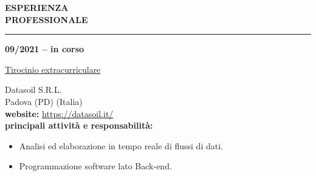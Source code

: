 \hspace{5mm}
\begin{minipage}[b]{0.3\textwidth}
	\textbf{ESPERIENZA \\PROFESSIONALE}
\end{minipage}%
\hfill
\hfill
\begin{minipage}[t]{0.6\textwidth}		
	\rule{\textwidth}{0.4pt}
\end{minipage}%
\vspace{5mm}


\begin{minipage}[t]{0.3\textwidth}
	\textbf{09/2021 – in corso}
\end{minipage}%
\hfill
\hfill
\begin{minipage}[t]{0.6\textwidth}		
	\begin{Large}
		\underline{Tirocinio extracurriculare} \vspace{1mm}\\
	\end{Large} 
		Datasoil S.R.L. \\
		Padova (PD) (Italia) \\
		\textbf{website:} \url{https://datasoil.it/} \vspace{1mm}\\
		\textbf{principali attività e responsabilità:}
		\begin{itemize}
			\item Analisi ed elaborazione in tempo reale di flussi di dati.
			\item Programmazione software lato Back-end.
		\end{itemize}
	\vspace{4mm}
\end{minipage}%
\\